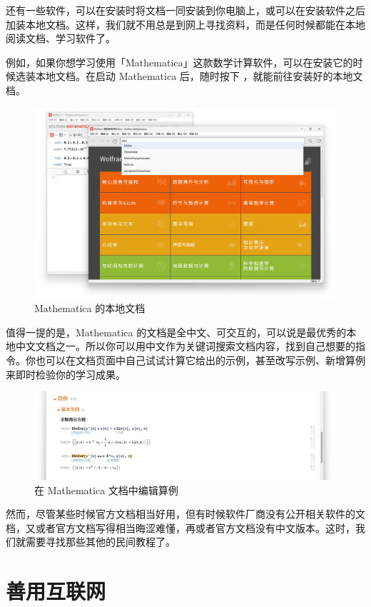 还有一些软件，可以在安装时将文档一同安装到你电脑上，或可以在安装软件之后加装本地文档。这样，我们就不用总是到网上寻找资料，而是任何时候都能在本地阅读文档、学习软件了。

例如，如果你想学习使用「Mathematica」这款数学计算软件，可以在安装它的时候选装本地文档。在启动 Mathematica 后，随时按下 ，就能前往安装好的本地文档。

\begin{figure}[htb!]
  \centering
  \includegraphics[width=.8\textwidth]{assets/software/MMA_document.png}
  \caption{Mathematica 的本地文档}
  \label{fig:MMA_document}
\end{figure}

值得一提的是，Mathematica 的文档是全中文、可交互的，可以说是最优秀的本地中文文档之一。所以你可以用中文作为关键词搜索文档内容，找到自己想要的指令。你也可以在文档页面中自己试试计算它给出的示例，甚至改写示例、新增算例来即时检验你的学习成果。

\begin{figure}[htb!]
  \centering
  \includegraphics[width=.7\textwidth]{assets/software/MMA_edit_in_document.png}
  \caption{在 Mathematica 文档中编辑算例}
  \label{fig:MMA_edit_in_document}
\end{figure}

然而，尽管某些时候官方文档相当好用，但有时候软件厂商没有公开相关软件的文档，又或者官方文档写得相当晦涩难懂，再或者官方文档没有中文版本。这时，我们就需要寻找那些其他的民间教程了。

\section{善用互联网}

